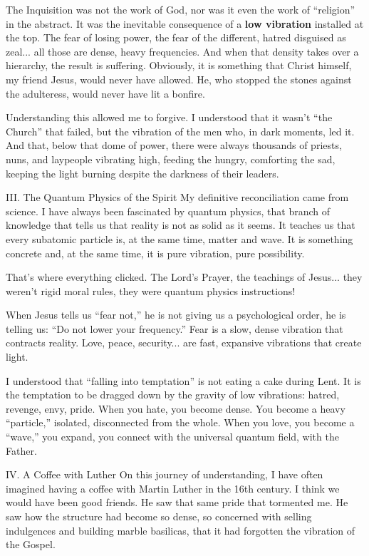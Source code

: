The Inquisition was not the work of God, nor was it even the work of ``religion'' in the abstract. It was the inevitable consequence of a \textbf{low vibration} installed at the top. The fear of losing power, the fear of the different, hatred disguised as zeal... all those are dense, heavy frequencies. And when that density takes over a hierarchy, the result is suffering. Obviously, it is something that Christ himself, my friend Jesus, would never have allowed. He, who stopped the stones against the adulteress, would never have lit a bonfire.


Understanding this allowed me to forgive. I understood that it wasn't ``the Church'' that failed, but the vibration of the men who, in dark moments, led it. And that, below that dome of power, there were always thousands of priests, nuns, and laypeople vibrating high, feeding the hungry, comforting the sad, keeping the light burning despite the darkness of their leaders.


III. The Quantum Physics of the Spirit
My definitive reconciliation came from science. I have always been fascinated by quantum physics, that branch of knowledge that tells us that reality is not as solid as it seems. It teaches us that every subatomic particle is, at the same time, matter and wave. It is something concrete and, at the same time, it is pure vibration, pure possibility.


That's where everything clicked. The Lord's Prayer, the teachings of Jesus... they weren't rigid moral rules, they were quantum physics instructions!


When Jesus tells us ``fear not,'' he is not giving us a psychological order, he is telling us: ``Do not lower your frequency.'' Fear is a slow, dense vibration that contracts reality. Love, peace, security... are fast, expansive vibrations that create light.


I understood that ``falling into temptation'' is not eating a cake during Lent. It is the temptation to be dragged down by the gravity of low vibrations: hatred, revenge, envy, pride. When you hate, you become dense. You become a heavy ``particle,'' isolated, disconnected from the whole. When you love, you become a ``wave,'' you expand, you connect with the universal quantum field, with the Father.


IV. A Coffee with Luther
On this journey of understanding, I have often imagined having a coffee with Martin Luther in the 16th century. I think we would have been good friends. He saw that same pride that tormented me. He saw how the structure had become so dense, so concerned with selling indulgences and building marble basilicas, that it had forgotten the vibration of the Gospel.


